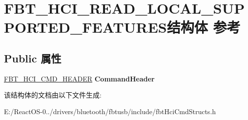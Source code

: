 \hypertarget{struct_f_b_t___h_c_i___r_e_a_d___l_o_c_a_l___s_u_p_p_o_r_t_e_d___f_e_a_t_u_r_e_s}{}\section{F\+B\+T\+\_\+\+H\+C\+I\+\_\+\+R\+E\+A\+D\+\_\+\+L\+O\+C\+A\+L\+\_\+\+S\+U\+P\+P\+O\+R\+T\+E\+D\+\_\+\+F\+E\+A\+T\+U\+R\+E\+S结构体 参考}
\label{struct_f_b_t___h_c_i___r_e_a_d___l_o_c_a_l___s_u_p_p_o_r_t_e_d___f_e_a_t_u_r_e_s}
\subsection*{Public 属性}
\begin{DoxyCompactItemize}
\item 
\mbox{\label{struct_f_b_t___h_c_i___r_e_a_d___l_o_c_a_l___s_u_p_p_o_r_t_e_d___f_e_a_t_u_r_e_s_ac12f4f3a4f2bd2a523a4e7b67c146681}} 
\hyperlink{struct_f_b_t___h_c_i___c_m_d___h_e_a_d_e_r}{F\+B\+T\+\_\+\+H\+C\+I\+\_\+\+C\+M\+D\+\_\+\+H\+E\+A\+D\+ER} {\bfseries Command\+Header}
\end{DoxyCompactItemize}


该结构体的文档由以下文件生成\+:\begin{DoxyCompactItemize}
\item 
E\+:/\+React\+O\+S-\/0../drivers/bluetooth/fbtusb/include/fbt\+Hci\+Cmd\+Structs.\+h\end{DoxyCompactItemize}

